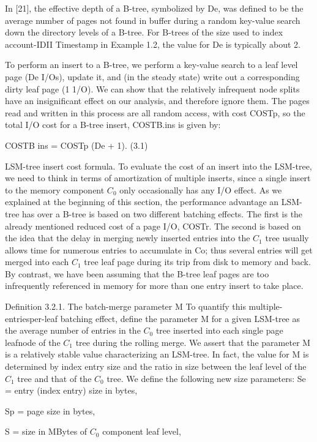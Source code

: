 \documentclass[a4paper,12pt,notitlepage,twoside,openright]{article}
\begin{document}
In {[}21{]}, the effective depth of a B-tree, symbolized by De, was
defined to be the average number of pages not found in buffer during a
random key-value search down the directory levels of a B-tree. For
B-trees of the size used to index account-IDII Timestamp in Example 1.2,
the value for De is typically about 2.

To perform an insert to a B-tree, we perform a key-value search to a
leaf level page (De I/Os), update it, and (in the steady state) write
out a corresponding dirty leaf page (1 1/O). We can show that the
relatively infrequent node splits have an insignificant effect on our
analysis, and therefore ignore them. The pages read and written in this
process are all random access, with cost COSTp, so the total I/O cost
for a B-tree insert, COSTB.ins is given by:


COSTB ins = COSTp (De + 1). (3.1)


LSM-tree insert cost formula. To evaluate the cost of an insert into the
LSM-tree, we need to think in terms of amortization of multiple inserts,
since a single insert to the memory component \(C_0\) only occasionally has
any I/O effect. As we explained at the beginning of this section, the
performance advantage an LSM-tree has over a B-tree is based on two
different batching effects. The first is the already mentioned reduced
cost of a page I/O, COSTr. The second is based on the idea that the
delay in merging newly inserted entries into the \(C_1\) tree usually allows
time for numerous entries to accumulate in Co; thus several entries will
get merged into each \(C_1\) tree leaf page during its trip from disk to
memory and back. By contrast, we have been assuming that the B-tree leaf
pages are too infrequently referenced in memory for more than one entry
insert to take place.

Definition 3.2.1. The batch-merge parameter M To quantify this
multiple-entriesper-leaf batching effect, define the parameter M for a
given LSM-tree as the average number of entries in the \(C_0\) tree inserted
into each single page leafnode of the \(C_1\) tree during the rolling merge.
We assert that the parameter M is a relatively stable value
characterizing an LSM-tree. In fact, the value for M is determined by
index entry size and the ratio in size between the leaf level of the \(C_1\)
tree and that of the \(C_0\) tree. We define the following new size
parameters: Se = entry (index entry) size in bytes,

Sp = page size in bytes,

S = size in MBytes of \(C_0\) component leaf level,
\end{document}
